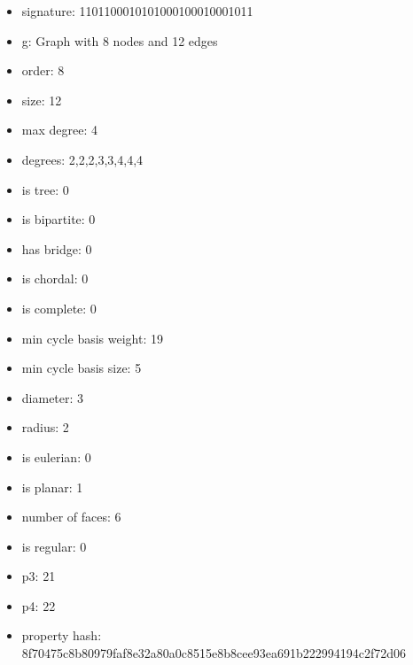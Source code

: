 \begin{itemize}
\item signature: 1101100010101000100010001011
\item g: Graph with 8 nodes and 12 edges
\item order: 8
\item size: 12
\item max degree: 4
\item degrees: 2,2,2,3,3,4,4,4
\item is tree: 0
\item is bipartite: 0
\item has bridge: 0
\item is chordal: 0
\item is complete: 0
\item min cycle basis weight: 19
\item min cycle basis size: 5
\item diameter: 3
\item radius: 2
\item is eulerian: 0
\item is planar: 1
\item number of faces: 6
\item is regular: 0
\item p3: 21
\item p4: 22
\item property hash: 8f70475c8b80979faf8e32a80a0c8515e8b8cee93ea691b222994194c2f72d06
\end{itemize}
\newpage
\begin{figure}
\end{figure}

